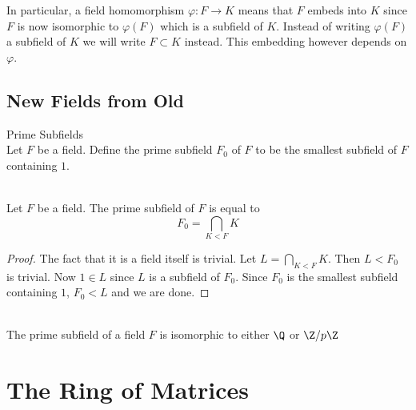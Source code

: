 \documentclass[a4paper]{article}
\begin{document}
In particular, a field homomorphism $\varphi:F\to K$ means that $F$ embeds into $K$ since $F$ is now isomorphic to $\varphi(F)$ which is a subfield of $K$. Instead of writing $\varphi(F)$ a subfield of $K$ we will write $F\subset K$ instead. This embedding however depends on $\varphi$. 

\subsection{New Fields from Old}
\begin{defn}{Prime Subfields}{}\\
Let $F$ be a field. Define the prime subfield $F_0$ of $F$ to be the smallest subfield of $F$ containing $1$. 
\end{defn}

\begin{lmm}{}{}\\
Let $F$ be a field. The prime subfield of $F$ is equal to $$F_0=\bigcap_{K<F}K$$ 
\begin{proof}
The fact that it is a field itself is trivial. Let $L=\bigcap_{K<F}K$.  Then $L<F_0$ is trivial. Now $1\in L$ since $L$ is a subfield of $F_0$. Since $F_0$ is the smallest subfield containing $1$, $F_0<L$ and we are done. 
\end{proof}
\end{lmm}

\begin{prp}{}{}\\
The prime subfield of a field $F$ is isomorphic to either $\Q$ or $\Z/p\Z$
\end{prp}

\pagebreak
\section{The Ring of Matrices}
\end{document}

